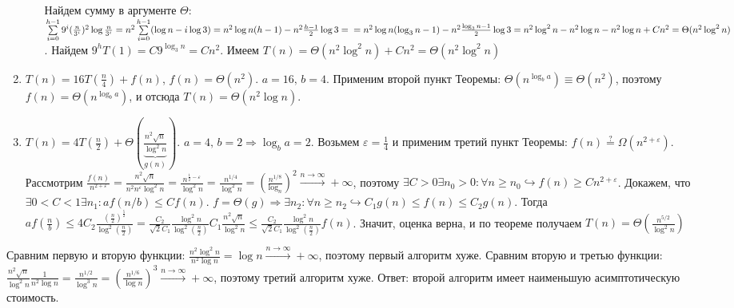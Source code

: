 \documentclass[a4paper]{article}
\def\eps{\varepsilon}
\begin{document}
\begin{enumerate}
\begin{enumerate}
Найдем сумму в аргументе $\Theta$: $\sum\limits_{i=0}^{h-1}9^i(\frac{n}{3^i})^2\log\frac{n}{3^i}=n^2\sum\limits_{i=0}^{h-1}(\log n-i\log 3)=n^2\log n(h-1)-n^2\frac{h-1}{2}\log 3=\newline=n^2\log n(\log_3n-1)-n^2\frac{\log_3n-1}{2}\log 3=n^2\log^2n-n^2\log n-n^2\log n+Cn^2=\Theta(n^2\log^2 n)$.\newline
Найдем $9^hT(1)=C9^{\log_3 n}=Cn^2$. Имеем $T(n)=\Theta(n^2\log^2n)+Cn^2=\boxed{\Theta(n^2\log^2n)}$
\end{enumerate}
\item $T(n)=16T(\frac{n}{4})+f(n)$, $f(n)=\Theta(n^2)$. $a=16,\,b=4$. Применим второй пункт Теоремы: $\Theta(n^{\log_b a})\equiv\Theta(n^2)$, поэтому $f(n)=\Theta(n^{\log_b a})$, и отсюда $T(n)=\boxed{\Theta(n^2\log n)}$.
\item $T(n)=4T(\frac{n}{2})+\Theta(\underbrace{\frac{n^2\sqrt{n}}{\log^2n}}_{g(n)})$. $a=4,\,b=2\Rightarrow\log_b a=2$. Возьмем $\eps=\frac{1}{4}$ и применим третий пункт Теоремы: $f(n)\overset{?}{=}\Omega(n^{2+\eps})$. Рассмотрим $\frac{f(n)}{n^{2+\eps}}=\frac{n^2\sqrt{n}}{n^2n^\eps\log^2 n}=\frac{n^{\frac{1}{2}-\eps}}{\log^2 n}=\frac{n^{1/4}}{\log^2 n}=(\frac{n^{1/8}}{\log_n})^2\overset{n\to\infty}{\longrightarrow}+\infty$, поэтому $\exists C>0\exists n_0>0\colon \forall n\geqslant n_0\hookrightarrow f(n)\geqslant C n^{2+\eps}$. Докажем, что $\exists 0<C<1\exists n_1\colon af(n/b)\leqslant Cf(n)$. $f=\Theta(g)\Rightarrow\exists n_2\colon\forall n\geqslant n_2\hookrightarrow C_1g(n)\leqslant f(n)\leqslant C_2 g(n)$. Тогда $af(\frac{n}{b})\leqslant 4C_2\frac{(\frac{n}{2})^\frac{5}{2}}{\log^2(\frac{n}{2})}=\frac{C_2}{\sqrt{2}C_1}\frac{\log^2n}{\log^2(\frac{n}{2})}C_1\frac{n^2\sqrt{n}}{\log^2 n}\leqslant \frac{C_2}{\sqrt{2}C_1}\frac{\log^2n}{\log^2(\frac{n}{2})}f(n)$. Значит, оценка верна, и по теореме получаем $T(n)=\boxed{\Theta(\frac{n^{5/2}}{\log^2n})}$
\end{enumerate}
Сравним первую и вторую функции: $\frac{n^2\log^2 n}{n^2\log n}=\log n\overset{n\to\infty}{\longrightarrow}+\infty$, поэтому первый алгоритм хуже. Сравним вторую и третью функции: $\frac{n^2\sqrt{n}}{\log^2n}\frac{1}{n^2\log n}=\frac{n^{1/2}}{\log^3 n}=(\frac{n^{1/6}}{\log n})^3\overset{n\to\infty}{\longrightarrow}+\infty$, поэтому третий алгоритм хуже.\newline
Ответ: $\boxed{\mbox{второй алгоритм}}$ имеет наименьшую асимптотическую стоимость.
\end{document}
